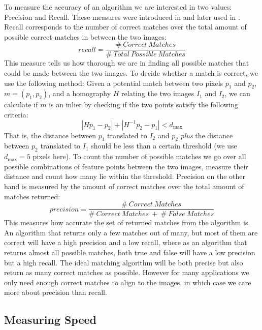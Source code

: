 To measure the accuracy of an algorithm we are interested in two values:
Precision and Recall. These measures were introduced in \cite{ke2004pca}
and later used in \cite{mikolajczyk2005performance}. Recall corresponds 
to the number of correct matches over the total amount of possible 
correct matches in between the two images:
\begin{equation*}
	recall = \frac{\# ~ Correct ~ Matches}{\# ~ Total ~ Possible ~ 
	Matches}
\end{equation*}
This measure tells us how thorough we are in finding all possible 
matches that could be made between the two images. To decide whether a 
match is correct, we use the following method:
Given a potential match between two pixels $p_1$ and $p_2$, $m = 
\left(p_1, p_2\right)$, and a homography $H$ relating the two images 
$I_1$ and $I_2$, we can calculate if $m$ is an inlier by checking if the 
two points satisfy the following criteria:
\begin{equation*}
\left\vert H p_1 - p_2 \right\vert + \left\vert H^{-1}p_2 - p_1 \right\vert < d_{\max}
\end{equation*}
That is, the distance between $p_1$ translated to $I_2$ and $p_2$ 
\emph{plus} the distance between $p_2$ translated to $I_1$ should be 
less than a certain threshold (we use $d_{\max}=5$ pixels here). To 
count the number of possible matches we go over all possible 
combinations of feature points between the two images, measure their 
distance and count how many lie within the threshold.
Precision on the other hand is measured by the amount of correct matches
over the total amount of matches returned:
\begin{equation*}
	precision = \frac{\# ~ Correct ~ Matches}{\# ~ Correct ~ Matches ~ + 
	~ \# ~ False ~ Matches}
\end{equation*}
This measures how accurate the set of returned matches from the 
algorithm is. An algorithm that returns only a few matches out of many, 
but most of them are correct will have a high precision and a low 
recall, where as an algorithm that returns almost all possible matches, 
both true and false will have a low precision but a high recall. The 
ideal matching algorithm will be both precise but also return as many 
correct matches as possible. However for many applications we only need 
enough correct matches to align to the images, in which case we care 
more about precision than recall. 

\subsection{Measuring Speed}


